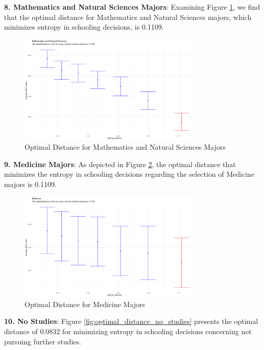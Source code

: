 \textbf{8. Mathematics and Natural Sciences Majors}:
   Examining Figure \ref{fig:optimal_distance_math_natural_sci}, we find that the optimal distance for Mathematics and Natural Sciences majors, which minimizes entropy in schooling decisions, is 0.1109.

\begin{figure}[H]
    \centering
    \includegraphics[width=0.8\textwidth]{Graph/Results/optimal_distance_bs30_MATHEMATICS_NATURAL_SCIENCES.png}
    \caption{Optimal Distance for Mathematics and Natural Sciences Majors}
    \label{fig:optimal_distance_math_natural_sci}
\end{figure}

\textbf{ 9. Medicine Majors}:
   As depicted in Figure \ref{fig:optimal_distance_medicine}, the optimal distance that minimizes the entropy in schooling decisions regarding the selection of Medicine majors is 0.1109.

\begin{figure}[htbp]
    \centering
    \includegraphics[width=0.8\textwidth]{Graph/Results/optimal_distance_bs30_MEDICINE.png}
    \caption{Optimal Distance for Medicine Majors}
    \label{fig:optimal_distance_medicine}
\end{figure}

\textbf{ 10. No Studies}:
    Figure \ref{fig:optimal_distance_no_studies} presents the optimal distance of 0.0832 for minimizing entropy in schooling decisions concerning not pursuing further studies.

